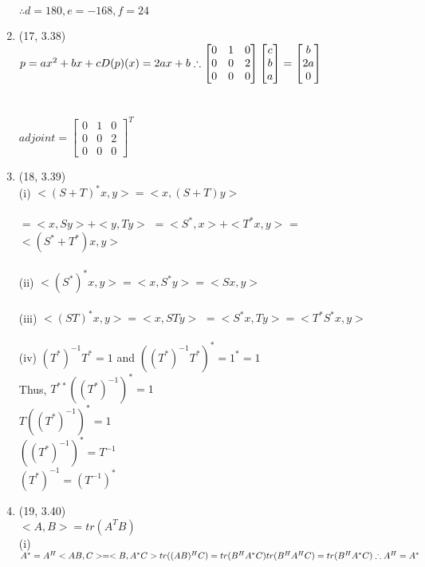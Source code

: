 \documentclass[letterpaper,12pt]{article}
\theoremstyle{definition}
\begin{document}
\begin{enumerate}
$\therefore d=180, e=-168, f=24$


		 
	\item (17, 3.38) \\ $p = ax^2 + bx + c \\ D(p)(x)=2ax+b\\ \therefore \begin{bmatrix}
			0&1&0\\0&0&2\\0&0&0\end{bmatrix} \begin{bmatrix}
			c\\b\\a\end{bmatrix} = \begin{bmatrix}b\\2a\\0\end{bmatrix}$  \\ \\ \\
			$adjoint = \begin{bmatrix}
			0&1&0\\0&0&2\\0&0&0\end{bmatrix}^T$


	\item (18, 3.39) \\
(i) $<(S+T)^*x, y> = <x, (S+T)y>$
\\
\\
$=<x,Sy> + <y,Ty>$
$=<S^*,x> + <T^*x,y>$ = $<(S^*+T^*)x,y>$
\\
\\
(ii)
$<(S^*)^*x, y> = <x,S^*y> = <Sx,y>$
\\
\\
(iii)
$<(ST)^*x,y> = <x,STy>$
$=<S^*x, Ty> = <T^*S^*x, y>$
\\
\\
(iv)
$(T^*)^{-1}T^*=1$ and $((T^*)^{-1}T^*)^*=1^*=1$
\\
Thus, $T^{**}((T^*)^{-1})^*=1$
\\
$T((T^*)^{-1})^*=1$
\\
$((T^*)^{-1})^*=T^{-1}$
\\
$(T^*)^{-1}=(T^{-1})^*$



	\item (19, 3.40)  \\$<A,B> = tr(A^TB)$ \\
				(i) $A^* = A^H \\ <AB,C> = <B,A^*C> \\ tr((AB)^HC)=tr(B^HA^*C) \\ tr(B^HA^HC) = tr(B^HA^*C) \\ \therefore A^H = A^*  $\\


\end{enumerate}
\end{document}
